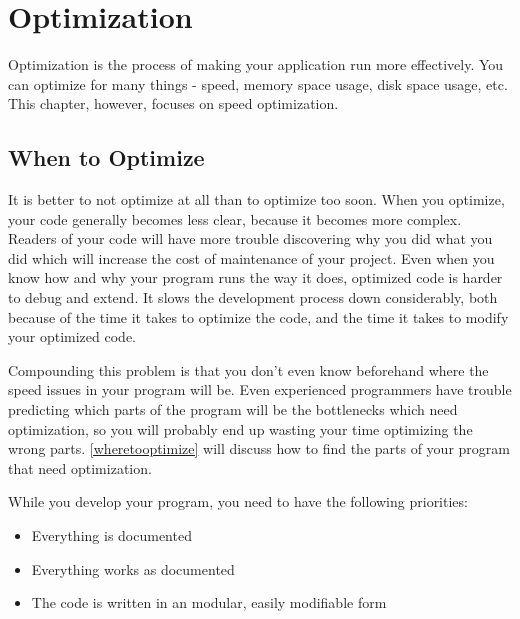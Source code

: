 \chapter{Optimization}
\label{optimizationch}

% 
% 
% 
% 

Optimization is the process of making your application run more
effectively.  You can optimize for many things - speed, memory
space usage, disk space usage, etc. This chapter, however, 
focuses on speed optimization.

\section{When to Optimize}

It is better to not optimize at all than to optimize too soon.  When you
optimize, your code generally becomes less clear, because it becomes
more complex.  Readers of your code will have more trouble discovering
why you did what you did which will increase the cost of maintenance 
of your project.  Even when you know how and why your program runs the way
it does, optimized code is harder to debug and extend.  It slows the
development process down considerably, both because of the time it
takes to optimize the code, and the time it takes to modify your 
optimized code.

Compounding this problem is that you don't even know beforehand where
the speed issues in your program will be.  Even experienced programmers
have trouble predicting which parts of the program will be the bottlenecks
which need optimization,
so you will probably end up wasting your time optimizing the wrong parts.
\autoref{wheretooptimize} will discuss how to find the parts of
your program that need optimization.

While you develop your program, you need to have the following priorities:

\begin{itemize}\item Everything is documented 
\item Everything works as documented 
\item The code is written in an modular, easily modifiable form 
\end{itemize}

